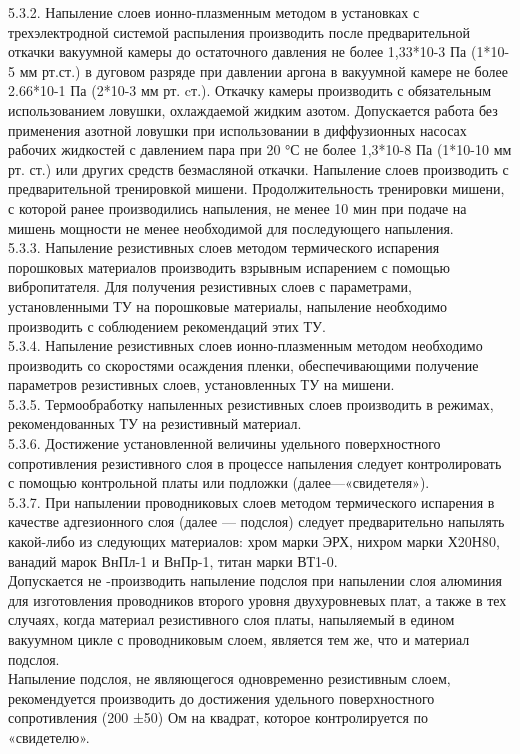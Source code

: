 \documentclass{bmstu}
\begin{document}
	5.3.2. Напыление слоев ионно-плазменным методом в установках с трехэлектродной системой распыления производить после предварительной откачки вакуумной камеры до остаточного давления не более 1,33*10-3  Па (1*10-5   мм рт.ст.) в дуговом разряде при давлении аргона в вакуумной камере не более 2.66*10-1  Па (2*10-3  мм рт. cт.). Откачку камеры производить с обязательным использованием ловушки, охлаждаемой жидким азотом. Допускается работа без применения азотной ловушки при использовании в диффузионных насосах рабочих жидкостей с давлением пара при 20 °С не более 1,3*10-8  Па (1*10-10  мм рт. ст.) или других средств безмасляной откачки. Напыление слоев производить с предварительной тренировкой мишени. Продолжительность тренировки мишени, с которой ранее производились напыления, не менее 10 мин при подаче на мишень мощности не менее необходимой для последующего напыления.  \\
	5.3.3. Напыление резистивных слоев методом термического испарения порошковых материалов производить взрывным испарением с помощью вибропитателя. Для получения резистивных слоев с параметрами, установленными ТУ на порошковые материалы, напыление необходимо производить с соблюдением рекомендаций этих ТУ. \\
	5.3.4. Напыление резистивных слоев ионно-плазменным методом необходимо производить со скоростями осаждения пленки, обеспечивающими получение параметров резистивных слоев, установленных ТУ на мишени. \\
	5.3.5. Термообработку напыленных  резистивных слоев производить в режимах, рекомендованных ТУ на резистивный материал. \\
	5.3.6. Достижение установленной величины удельного поверхностного сопротивления резистивного слоя в процессе напыления следует контролировать с помощью контрольной платы или подложки (далее—«свидетеля»). \\
	5.3.7. При напылении проводниковых слоев методом термического испарения в качестве адгезионного слоя (далее — подслоя) следует предварительно напылять какой-либо из следующих материалов: хром марки ЭРХ, нихром марки Х20Н80, ванадий марок ВнПл-1 и ВнПр-1, титан марки ВТ1-0. \\
	Допускается не -производить напыление подслоя при напылении слоя алюминия для изготовления проводников второго уровня двухуровневых плат, а также в тех случаях, когда материал резистивного слоя платы, напыляемый в едином вакуумном цикле с проводниковым слоем, является тем же, что и материал подслоя. \\
	Напыление подслоя, не являющегося одновременно резистивным слоем, рекомендуется производить до достижения удельного поверхностного сопротивления (200 ±50) Ом на квадрат, которое контролируется по «свидетелю». \\
\end{document}
